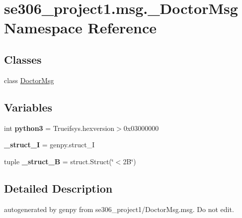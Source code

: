 \hypertarget{namespacese306__project1_1_1msg_1_1__DoctorMsg}{\section{se306\-\_\-project1.\-msg.\-\_\-\-Doctor\-Msg Namespace Reference}
\label{namespacese306__project1_1_1msg_1_1__DoctorMsg}
}
\subsection*{Classes}
\begin{DoxyCompactItemize}
\item 
class \hyperlink{classse306__project1_1_1msg_1_1__DoctorMsg_1_1DoctorMsg}{Doctor\-Msg}
\end{DoxyCompactItemize}
\subsection*{Variables}
\begin{DoxyCompactItemize}
\item 
\hypertarget{namespacese306__project1_1_1msg_1_1__DoctorMsg_ab1490ff5734e2153fbc9f3ac4fbdd4fa}{int {\bfseries python3} = Trueifsys.\-hexversion$>$0x03000000}\label{namespacese306__project1_1_1msg_1_1__DoctorMsg_ab1490ff5734e2153fbc9f3ac4fbdd4fa}

\item 
\hypertarget{namespacese306__project1_1_1msg_1_1__DoctorMsg_a074550654ddac71c27f8ce10c00c240c}{{\bfseries \-\_\-struct\-\_\-\-I} = genpy.\-struct\-\_\-\-I}\label{namespacese306__project1_1_1msg_1_1__DoctorMsg_a074550654ddac71c27f8ce10c00c240c}

\item 
\hypertarget{namespacese306__project1_1_1msg_1_1__DoctorMsg_ac99685f7582c038e377053950447f2fe}{tuple {\bfseries \-\_\-struct\-\_\-B} = struct.\-Struct(\char`\"{}$<$2\-B\char`\"{})}\label{namespacese306__project1_1_1msg_1_1__DoctorMsg_ac99685f7582c038e377053950447f2fe}

\end{DoxyCompactItemize}


\subsection{Detailed Description}
\begin{DoxyVerb}autogenerated by genpy from se306_project1/DoctorMsg.msg. Do not edit.\end{DoxyVerb}
 